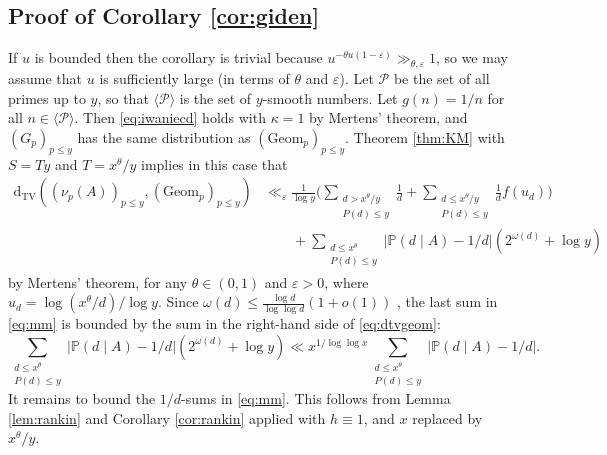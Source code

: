 \documentclass{article}
\theoremstyle{plain}
\theoremstyle{remark}
\newcommand{\PP}{\mathbb{P}}
\newcommand{\Pa}{\mathcal{P}}
\newcommand{\dtv}{\mathrm{d}_{\mathrm{TV}}}
\newcommand{\Geom}{\mathrm{Geom}}
\numberwithin{equation}{section}
\begin{document}
\subsection{Proof of Corollary \ref{cor:giden}}
If $u$ is bounded then the corollary is trivial because $u^{-\theta u(1-\varepsilon)} \gg_{\theta,\varepsilon} 1$, so we may assume that $u$ is sufficiently large (in terms of $\theta$ and $\varepsilon$). Let $\Pa$ be the set of all primes up to $y$, so that $\langle \Pa\rangle$ is the set of $y$-smooth numbers. Let $g(n)=1/n$ for all $n\in \langle \Pa \rangle$. Then \eqref{eq:iwaniecd} holds with $\kappa=1$ by Mertens' theorem, and $(G_p)_{p\le y}$ has the same distribution as $(\Geom_p)_{p\le y}$. Theorem \ref{thm:KM} with $S=Ty$ and $T=x^{\theta}/y$ implies in this case that
\begin{equation}\label{eq:mm}
	\begin{split}
	\dtv( (\nu_p(A))_{p\le y}, (\Geom_p)_{p \le y}) &\ll_{\varepsilon} \frac{1}{\log y}\bigg(\sum_{\substack{ d>x^{\theta}/y \\ P(d)\le y}} \frac{1}{d}+\sum_{\substack{ d \le x^{\theta}/y\\ P(d)\le y}} \frac{1}{d} f(u_d)\bigg)  \\&\qquad + \sum_{\substack{d\le x^{\theta}\\ P(d)\le y }}|\PP(d\mid A)-1/d| (2^{\omega(d)}+\log y)
	\end{split}
\end{equation}
by Mertens' theorem, for any $\theta \in (0,1)$ and $\varepsilon>0$, where $u_{d}=\log(x^{\theta}/d)/\log y$. Since $\omega(d) \le \tfrac{\log d}{\log \log d} (1+o(1))$ \cite[Theorem 2.10]{MV}, the last sum in \eqref{eq:mm} is bounded by the sum in the right-hand side of \eqref{eq:dtvgeom}:
\[ \sum_{\substack{d\le x^{\theta}\\ P(d)\le y }}|\PP(d\mid A)-1/d| (2^{\omega(d)}+\log y)\ll x^{1/\log \log x}\sum_{\substack{d\le x^{\theta}\\ P(d)\le y}} |\PP(d\mid A)-1/d|.\]
It remains to bound the $1/d$-sums in \eqref{eq:mm}. This follows from Lemma \ref{lem:rankin} and Corollary \ref{cor:rankin} applied with $h\equiv 1$, and $x$ replaced by $x^{\theta}/y$.
\end{document}
